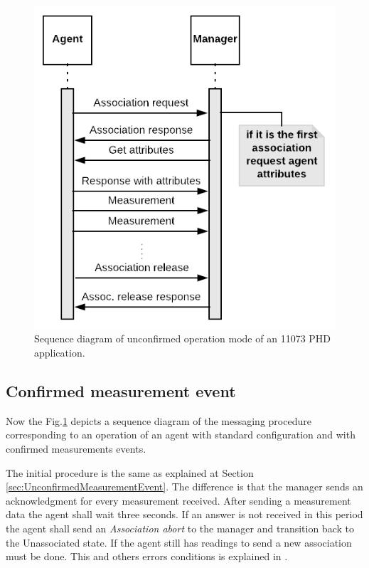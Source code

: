 \begin{figure}[htbp]
\centerline{\includegraphics[scale=0.35]{figures/unconfirmed.png}}
\caption{Sequence diagram of unconfirmed operation mode of an 11073 PHD application.}
\label{fig:unconfirmedMode}
\end{figure}

\subsection{Confirmed measurement event}

Now the Fig.\ref{fig:unconfirmedMode} depicts a sequence diagram of the messaging procedure corresponding to an operation of an agent with standard configuration and with confirmed measurements events.

The initial procedure is the same as explained at Section \ref{sec:UnconfirmedMeasurementEvent}. The difference is that the manager sends an acknowledgment for every measurement received. After sending a measurement data the agent shall wait three seconds. If an answer is not received in this period the agent shall send an \textit{Association abort} to the manager and transition back to the Unassociated state. If the agent still has readings to send a new association must be done. This and others errors conditions is explained in \cite{b1}.

